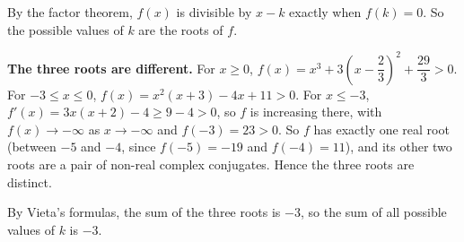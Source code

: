 By the factor theorem, $f(x)$ is divisible by $x-k$ exactly when $f(k)=0$. So the possible values of $k$ are the roots of $f$.

\textbf{The three roots are different.} For $x\ge0$, $f(x)=x^3+3\left(x-\dfrac23\right)^2+\dfrac{29}{3}>0$. For $-3\le x\le0$, $f(x)=x^2(x+3)-4x+11>0$. For $x\le-3$, $f'(x)=3x(x+2)-4\ge9-4>0$, so $f$ is increasing there, with $f(x)\to-\infty$ as $x\to-\infty$ and $f(-3)=23>0$. So $f$ has exactly one real root (between $-5$ and $-4$, since $f(-5)=-19$ and $f(-4)=11$), and its other two roots are a pair of non-real complex conjugates. Hence the three roots are distinct.

By Vieta's formulas, the sum of the three roots is $-3$, so the sum of all possible values of $k$ is $\boxed{-3}$.
